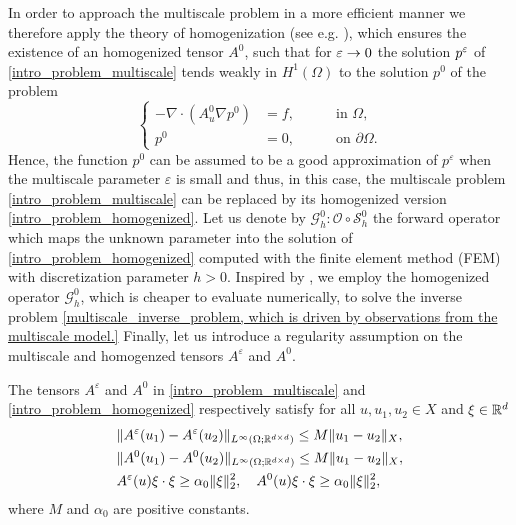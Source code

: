 In order to approach the multiscale problem in a more efficient manner we therefore apply the theory of homogenization (see e.g. \cite{CiD99}), which ensures the existence of an homogenized tensor $A^0$, such that for $\varepsilon \to 0$ the solution $p^\varepsilon$ of \eqref{intro_problem_multiscale} tends weakly in $H^1(\Omega)$ to the solution $p^0$ of the problem
\begin{equation}
\label{intro_problem_homogenized}
\left\{
\begin{alignedat}{2}
	- \nabla \cdot ( A^0_u \nabla p^0 ) &= f, \quad && \text{ in } \Omega, \\
	p^0 &= 0, \quad && \text{ on } \partial \Omega.
\end{alignedat}
\right.
\end{equation}
Hence, the function $p^0$ can be assumed to be a good approximation of $p^{\varepsilon}$ when the multiscale parameter $\varepsilon$ is small and thus, in this case, the multiscale problem \eqref{intro_problem_multiscale} can be replaced by its homogenized version \eqref{intro_problem_homogenized}. Let us denote by $\mathcal{G}^0_h \colon \mathcal{O} \circ \mathcal{S}^0_h$ the forward operator which maps the unknown parameter into the solution of \eqref{intro_problem_homogenized} computed with the finite element method (FEM) with discretization parameter $h > 0$. Inspired by \cite{NPS12, AbD17, AbD18}, we employ the homogenized operator $\mathcal G^0_h$, which is cheaper to evaluate numerically, to solve the inverse problem \eqref{multiscale_inverse_problem, which is driven by observations from the multiscale model.} Finally, let us introduce a regularity assumption on the multiscale and homogenzed tensors $A^{\varepsilon}$ and $A^0$.
\begin{assumption} \label{ass_A}
The tensors $A^{\varepsilon}$ and $A^0$ in \eqref{intro_problem_multiscale} and \eqref{intro_problem_homogenized} respectively satisfy for all $u, u_1, u_2 \in X$ and $\xi \in \mathbb{R}^d$
\begin{align*}
& \lVert A^{\varepsilon}(u_1) - A^{\varepsilon}(u_2)\rVert_{L^{\infty}(\Omega;\mathbb{R}^{d \times d})} \le M \lVert u_1 - u_2\rVert_X, \\
& \lVert A^0(u_1) - A^0(u_2)\rVert_{L^{\infty}(\Omega;\mathbb{R}^{d \times d})} \le M \lVert u_1 - u_2\rVert_X, \\
&A^{\varepsilon}(u) \xi \cdot \xi \ge \alpha_0 \lVert\xi\rVert_2^2, \quad A^0(u) \xi \cdot \xi \ge \alpha_0 \lVert\xi\rVert_2^2,
\end{align*}
where $M$ and $\alpha_0$ are positive constants.
\end{assumption}

